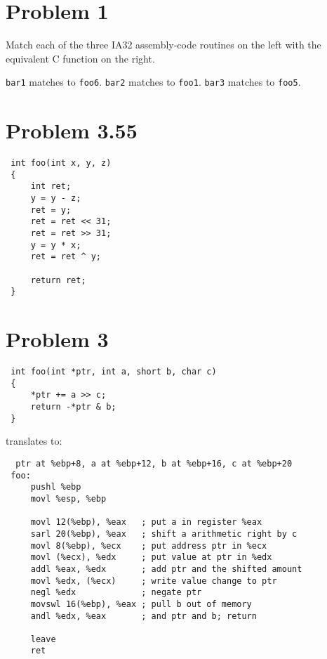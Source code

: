 \documentclass[fleqn]{article}
\begin{document}

\section*{Problem 1}

Match each of the three IA32 assembly-code routines on the left with the equivalent C function on the right.

 \begin{solution}
   \texttt{bar1} matches to \texttt{foo6}. \texttt{bar2} matches to \texttt{foo1}. \texttt{bar3} matches to \texttt{foo5}.
 \end{solution}

\section*{Problem 3.55}

 \begin{solution}
 \begin{verbatim}
 int foo(int x, y, z)
 {
     int ret;
     y = y - z;
     ret = y;
     ret = ret << 31;
     ret = ret >> 31;
     y = y * x;
     ret = ret ^ y;
     
     return ret;
 }
 \end{verbatim}
 \end{solution}
 
 \section*{Problem 3}
 
 \begin{solution}
 \begin{verbatim}
 int foo(int *ptr, int a, short b, char c)
 {
     *ptr += a >> c;
     return -*ptr & b;
 }
 \end{verbatim}
 
 translates to:
 
 \begin{verbatim}
  ptr at %ebp+8, a at %ebp+12, b at %ebp+16, c at %ebp+20
 foo:
     pushl %ebp
     movl %esp, %ebp
     
     movl 12(%ebp), %eax   ; put a in register %eax
     sarl 20(%ebp), %eax   ; shift a arithmetic right by c
     movl 8(%ebp), %ecx    ; put address ptr in %ecx
     movl (%ecx), %edx     ; put value at ptr in %edx
     addl %eax, %edx       ; add ptr and the shifted amount
     movl %edx, (%ecx)     ; write value change to ptr
     negl %edx             ; negate ptr
     movswl 16(%ebp), %eax ; pull b out of memory
     andl %edx, %eax       ; and ptr and b; return
     
     leave
     ret
 \end{verbatim}
 
 \end{solution}
\end{document}
